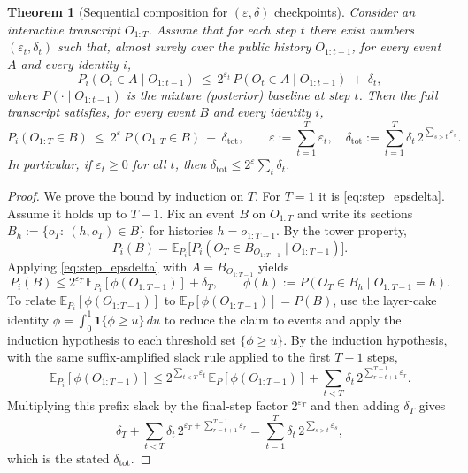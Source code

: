 \documentclass[11pt]{article}
\newcommand{\EE}{\mathbb{E}}
\newcommand{\one}{\mathbf{1}}
\newtheorem{theorem}{Theorem}
\theoremstyle{definition}
\theoremstyle{remark}
\begin{document}
\begin{theorem}[Sequential composition for $(\varepsilon,\delta)$ checkpoints]\label{thm:epsdelta_comp}
Consider an interactive transcript $O_{1:T}$.
Assume that for each step $t$ there exist numbers $(\varepsilon_t,\delta_t)$ such that, almost surely over the public history $O_{1:t-1}$,
for every event $A$ and every identity $i$,
\begin{equation}\label{eq:step_epsdelta}
P_i(O_t\in A\mid O_{1:t-1})\ \le\ 2^{\varepsilon_t}\,P(O_t\in A\mid O_{1:t-1})\ +\ \delta_t,
\end{equation}
where $P(\cdot\mid O_{1:t-1})$ is the mixture (posterior) baseline at step $t$.
Then the full transcript satisfies, for every event $B$ and every identity $i$,
\[
P_i(O_{1:T}\in B)\ \le\ 2^{\varepsilon}\,P(O_{1:T}\in B)\ +\ \delta_{\mathrm{tot}},
\qquad \varepsilon:=\sum_{t=1}^T \varepsilon_t,\quad
\delta_{\mathrm{tot}}:=\sum_{t=1}^T \delta_t\,2^{\sum_{s>t}\varepsilon_s}.
\]
In particular, if $\varepsilon_t\ge 0$ for all $t$, then $\delta_{\mathrm{tot}}\le 2^{\varepsilon}\sum_t\delta_t$.
\end{theorem}

\begin{proof}
We prove the bound by induction on $T$.
For $T=1$ it is \eqref{eq:step_epsdelta}.
Assume it holds up to $T-1$.
Fix an event $B$ on $O_{1:T}$ and write its sections
$B_h:=\{o_T:\ (h,o_T)\in B\}$ for histories $h=o_{1:T-1}$.
By the tower property,
\[
P_i(B)=\EE_{P_i}\bigl[P_i(O_T\in B_{O_{1:T-1}}\mid O_{1:T-1})\bigr].
\]
Applying \eqref{eq:step_epsdelta} with $A=B_{O_{1:T-1}}$ yields
\[
P_i(B)\le 2^{\varepsilon_T}\,\EE_{P_i}[\phi(O_{1:T-1})]+\delta_T,
\qquad \phi(h):=P(O_T\in B_h\mid O_{1:T-1}=h).
\]
To relate $\EE_{P_i}[\phi(O_{1:T-1})]$ to $\EE_P[\phi(O_{1:T-1})]=P(B)$, use the layer-cake identity
$\phi=\int_0^1 \one\{\phi\ge u\}\,du$ to reduce the claim to events and apply the induction hypothesis to each threshold set $\{\phi\ge u\}$.
By the induction hypothesis, with the same suffix-amplified slack rule applied to the first $T-1$ steps,
\[
\EE_{P_i}[\phi(O_{1:T-1})]\le 2^{\sum_{t<T}\varepsilon_t}\,\EE_P[\phi(O_{1:T-1})]+\sum_{t<T}\delta_t\,2^{\sum_{r=t+1}^{T-1}\varepsilon_r}.
\]
Multiplying this prefix slack by the final-step factor $2^{\varepsilon_T}$ and then adding $\delta_T$ gives
\[
\delta_T+\sum_{t<T}\delta_t\,2^{\varepsilon_T+\sum_{r=t+1}^{T-1}\varepsilon_r}
=\sum_{t=1}^T\delta_t\,2^{\sum_{s>t}\varepsilon_s},
\]
which is the stated $\delta_{\mathrm{tot}}$.
\end{proof}
\end{document}
